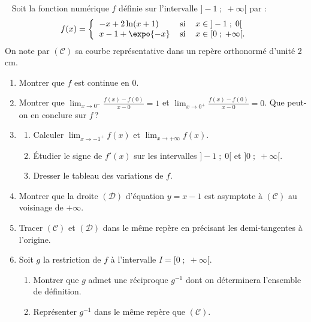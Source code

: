 \begin{exo} ~ \newline
\label{exo:el raccord ln exp}
Soit la fonction num\'erique $f$ d\'efinie sur l'intervalle $]-1 \; ; \; +\infty[$ par :
\begin{displaymath}
f(x) =
\left\lbrace
\begin{tabular}{lll}
$ - x + 2 \ln (x + 1) $ & si & $ x \in \; ] -1 \; ; \; 0[ $ \\
$ x - 1 + \expo{-x} $ & si & $ x \in [0 \; ; \; + \infty[ $.
\end{tabular}
\right.
\end{displaymath}
On note par $(\mathscr{C})$ sa courbe repr\'esentative dans un rep\`ere orthonorm\'e \Oij d'unit\'e 2 cm.
\begin{enumerate}
\item Montrer que $f$ est continue en $0$.
\item Montrer que $\lim_{x \rightarrow 0^-} \frac{f(x) - f(0)}{x - 0} = 1$ et
      $\lim_{x \rightarrow 0^+} \frac{f(x) - f(0)}{x - 0} = 0$.
      Que peut-on en conclure sur $f$\,?
\item \begin{enumerate}
      \item Calculer $\lim_{x \rightarrow -1^+} f(x)$ et $\lim_{x \rightarrow +\infty} f(x)$.
      \item \'Etudier le signe de $f'(x)$ sur les intervalles $]-1 \; ; \; 0[$ et $] 0 \; ; \; +\infty[$.
      \item Dresser le tableau des variations de $f$.
      \end{enumerate}
\item Montrer que la droite $(\mathcal{D})$ d'\'equation $y = x- 1$ est asymptote \`a $(\mathscr{C})$ au voisinage de $+\infty$.
\item Tracer $(\mathscr{C})$ et $(\mathcal{D})$ dans le m\^eme rep\`ere \Oij en pr\'ecisant les demi-tangentes \`a l'origine.
\item Soit $g$ la restriction de $f$ \`a l'intervalle $I = [ 0 \; ; \; +\infty[$.
      \begin{enumerate}
      \item Montrer que $g$ admet une r\'eciproque $g^{-1}$ dont on d\'eterminera l'ensemble de d\'efinition.
      \item Repr\'esenter $g^{-1}$ dans le m\^eme rep\`ere que $(\mathscr{C})$.
      \end{enumerate}
\end{enumerate}

\end{exo}
